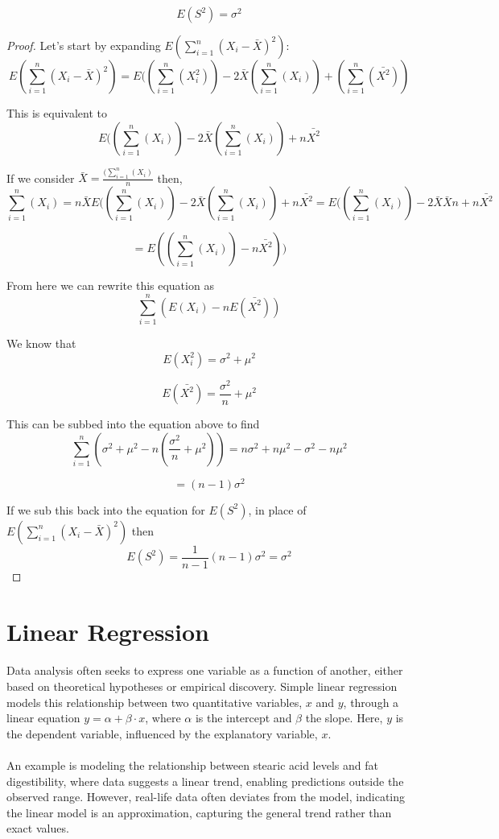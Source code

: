 \documentclass{article}
\begin{document}
\[
E(S^2) = \sigma^2
\]

\begin{proof}
\hfill \break
\hfill \break
Let's start by expanding $E(\sum_{i=1}^{n} (X_i - \bar{X})^2)$:
\[
E(\sum_{i=1}^{n} (X_i - \bar{X})^2) = E((\sum_{i=1}^{n} (X_i^2)) - 2\bar{X}(\sum_{i=1}^{n} (X_i)) + (\sum_{i=1}^{n} (\bar{X^2}))
\]

This is equivalent to
\[
E((\sum_{i=1}^{n} (X_i)) - 2\bar{X}(\sum_{i=1}^{n} (X_i)) + n\bar{X^2}
\]

If we consider $\bar{X} = \frac{(\sum_{i=1}^{n} (X_i)}{n}$ then,
\[
\sum_{i=1}^{n} (X_i) = n\bar{X}
E((\sum_{i=1}^{n} (X_i)) - 2\bar{X}(\sum_{i=1}^{n} (X_i)) + n\bar{X^2} = E((\sum_{i=1}^{n} (X_i)) - 2\bar{X}\bar{X}n + n\bar{X^2}
\]

\[
= E((\sum_{i=1}^{n} (X_i)) - n\bar{X^2}))
\]

From here we can rewrite this equation as
\[
\sum_{i=1}^{n} (E(X_i) - nE(\bar{X^2}))
\]

We know that
\[
E(X_i^2) = \sigma^2 + \mu^2
\]

\[
E(\bar{X^2}) = \frac{\sigma^2}{n} + \mu^2
\]

This can be subbed into the equation above to find
\[
\sum_{i=1}^{n} (\sigma^2 + \mu^2 - n(\frac{\sigma^2}{n} + \mu^2)) = n\sigma^2 + n\mu^2 - \sigma^2 - n\mu^2
\]

\[
= (n-1)\sigma^2
\]

If we sub this back into the equation for $E(S^2)$, in place of $E(\sum_{i=1}^{n} (X_i - \bar{X})^2)$ then
\[
E(S^2) = \frac{1}{n-1}(n - 1)\sigma^2 = \sigma^2
\]
\end{proof}

\section{Linear Regression}
\paragraph{}
Data analysis often seeks to express one variable as a function of another, either based on theoretical hypotheses or empirical discovery. Simple linear regression models this relationship between two quantitative variables, \( x \) and \( y \), through a linear equation \( y = \alpha + \beta \cdot x \), where \( \alpha \) is the intercept and \( \beta \) the slope. Here, \( y \) is the dependent variable, influenced by the explanatory variable, \( x \).
\paragraph{}
An example is modeling the relationship between stearic acid levels and fat digestibility, where data suggests a linear trend, enabling predictions outside the observed range. However, real-life data often deviates from the model, indicating the linear model is an approximation, capturing the general trend rather than exact values.
\end{document}
